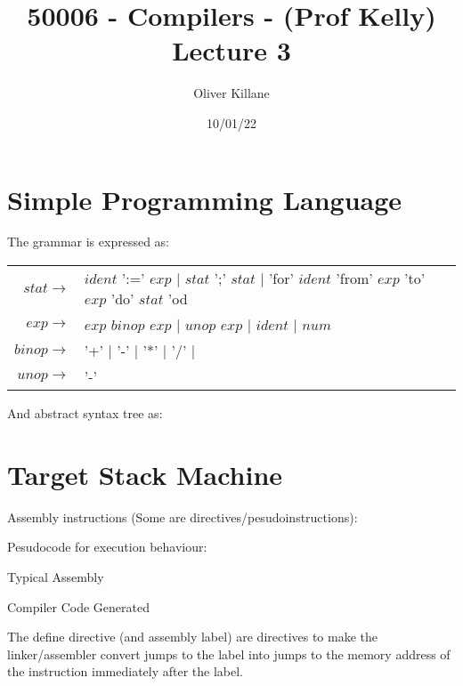 \documentclass{report}
\title{50006 - Compilers - (Prof Kelly) Lecture 3}
\author{Oliver Killane}
\date{10/01/22}
\begin{document}
    \maketitle

    \section*{Simple Programming Language}
        The grammar is expressed as:
        \begin{center}
            \begin{tabular}{r l}
                $stat \to$ & $ident$ ':=' $exp$ $|$ $stat$ ';' $stat$ $|$ 'for' $ident$ 'from' $exp$ 'to' $exp$ 'do' $stat$ 'od \\
                $exp \to$ & $exp$ $binop$ $exp$ $|$ $unop$ $exp$ $|$ $ident$ $|$ $num$ \\
                $binop \to$ & '+' $|$ '-' $|$ '*' $|$ '/' $|$ \\
                $unop \to$ & '-' \\
            \end{tabular}
        \end{center}

        And abstract syntax tree as:
    
    \section*{Target Stack Machine}
        Assembly instructions (Some are directives/pesudoinstructions):
        
        Pesudocode for execution behaviour:

        \begin{minipage}[t]{0.4\textwidth}
            \centerline{Typical Assembly}
        \end{minipage}
        \hfill
        \begin{minipage}[t]{0.4\textwidth}
            \centerline{Compiler Code Generated}
        \end{minipage}
        The define directive (and assembly label) are directives to make the linker/assembler convert jumps to the label into jumps to the memory address of the instruction immediately after the label.
        
\end{document}
